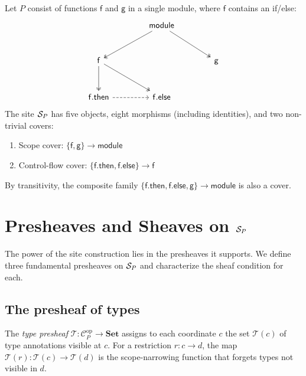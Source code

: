 \documentclass[11pt]{article}
\begin{document}
\begin{example}\label{ex:two-fn-site}
Let $P$ consist of functions $\mathsf{f}$ and $\mathsf{g}$ in a single
module, where $\mathsf{f}$ contains an if/else:
\[
\begin{tikzcd}[column sep=1.4cm, row sep=1cm]
  & \mathsf{module} \arrow[dl, two heads] \arrow[dr, two heads] & \\
  \mathsf{f} \arrow[d, two heads] \arrow[dr, two heads]
  & & \mathsf{g} \\
  \mathsf{f.then} \arrow[r, dashed]
  & \mathsf{f.else} &
\end{tikzcd}
\]
The site $\mathcal{S}_P$ has five objects, eight morphisms (including identities),
and two non-trivial covers:
\begin{enumerate}[nosep]
  \item Scope cover: $\{\mathsf{f}, \mathsf{g}\} \to \mathsf{module}$
  \item Control-flow cover: $\{\mathsf{f.then}, \mathsf{f.else}\} \to \mathsf{f}$
\end{enumerate}
By transitivity, the composite family
$\{\mathsf{f.then}, \mathsf{f.else}, \mathsf{g}\} \to \mathsf{module}$
is also a cover.
\end{example}

\section{Presheaves and Sheaves on $\mathcal{S}_P$}\label{sec:sheaves}

The power of the site construction lies in the presheaves it supports.
We define three fundamental presheaves on $\mathcal{S}_P$ and characterize the
sheaf condition for each.

\subsection{The presheaf of types}

\begin{definition}
The \emph{type presheaf} $\mathcal{T} \colon \mathcal{C}_P^{\mathrm{op}} \to
\mathbf{Set}$ assigns to each coordinate $c$ the set $\mathcal{T}(c)$ of
type annotations visible at $c$.  For a restriction $r \colon c \to d$,
the map $\mathcal{T}(r) \colon \mathcal{T}(c) \to \mathcal{T}(d)$ is the
scope-narrowing function that forgets types not visible in $d$.
\end{definition}
\end{document}
